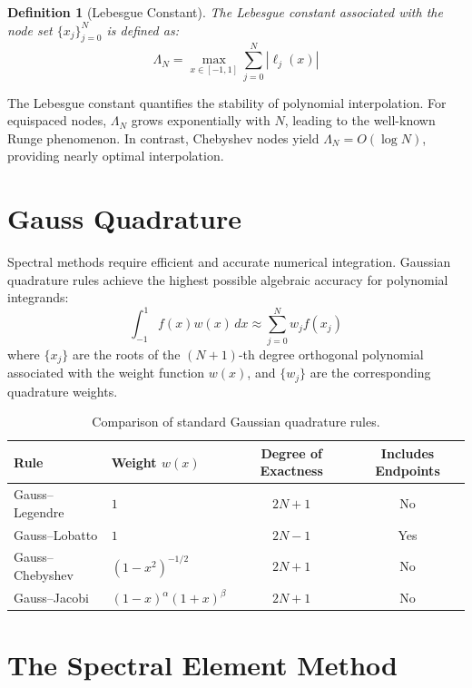 \documentclass[12pt,a4paper,oneside]{report}
\newtheorem{definition}[theorem]{Definition}
\begin{document}
\begin{definition}[Lebesgue Constant]
The Lebesgue constant associated with the node set $\{x_j\}_{j=0}^N$ is defined as:
\begin{equation}
  \Lambda_N = \max_{x \in [-1,1]} \sum_{j=0}^{N} |\ell_j(x)|
\end{equation}
\end{definition}

The Lebesgue constant quantifies the stability of polynomial interpolation. For equispaced nodes, $\Lambda_N$ grows exponentially with $N$, leading to the well-known Runge phenomenon. In contrast, Chebyshev nodes yield $\Lambda_N = O(\log N)$, providing nearly optimal interpolation.

\section{Gauss Quadrature}

Spectral methods require efficient and accurate numerical integration. Gaussian quadrature rules achieve the highest possible algebraic accuracy for polynomial integrands:
\begin{equation}
  \int_{-1}^{1} f(x) w(x) \, dx \approx \sum_{j=0}^{N} w_j f(x_j)
\end{equation}
where $\{x_j\}$ are the roots of the $(N+1)$-th degree orthogonal polynomial associated with the weight function $w(x)$, and $\{w_j\}$ are the corresponding quadrature weights.

\begin{table}[htbp]
\centering
\caption{Comparison of standard Gaussian quadrature rules.}
\label{tab:quadrature}
\begin{tabular}{@{}llcc@{}}
\toprule
\textbf{Rule} & \textbf{Weight $w(x)$} & \textbf{Degree of Exactness} & \textbf{Includes Endpoints} \\
\midrule
Gauss--Legendre       & $1$                   & $2N+1$ & No  \\
Gauss--Lobatto        & $1$                   & $2N-1$ & Yes \\
Gauss--Chebyshev      & $(1-x^2)^{-1/2}$     & $2N+1$ & No  \\
Gauss--Jacobi         & $(1-x)^\alpha(1+x)^\beta$ & $2N+1$ & No  \\
\bottomrule
\end{tabular}
\end{table}

\section{The Spectral Element Method}
\end{document}

